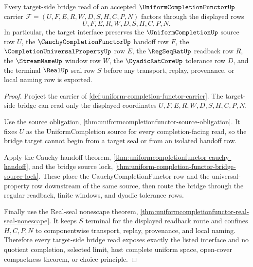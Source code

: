 \begin{theorem}
\label{thm:uniform-completion-functor-bridge-target-interface}
Every target-side bridge read of an accepted $\UniformCompletionFunctorUp$ carrier $\mathcal{F}=(U,F,E,R,W,D,S,H,C,P,N)$ factors through the displayed rows
$$
U,F,E,R,W,D,S,H,C,P,N .
$$
In particular, the target interface preserves the $\UniformCompletionUp$ source row $U$, the $\CauchyCompletionFunctorUp$ handoff row $F$, the $\CompletionUniversalPropertyUp$ row $E$, the $\RegSeqRatUp$ readback row $R$, the $\StreamNameUp$ window row $W$, the $\DyadicRatCoreUp$ tolerance row $D$, and the terminal $\RealUp$ seal row $S$ before any transport, replay, provenance, or local naming row is exported.
\end{theorem}
\begin{proof}
Project the carrier of \autoref{def:uniform-completion-functor-carrier}. The target-side bridge can read only the displayed coordinates $U,F,E,R,W,D,S,H,C,P,N$.

Use the source obligation, \autoref{thm:uniformcompletionfunctor-source-obligation}. It fixes $U$ as the UniformCompletion source for every completion-facing read, so the bridge target cannot begin from a target seal or from an isolated handoff row.

Apply the Cauchy handoff theorem, \autoref{thm:uniformcompletionfunctor-cauchy-handoff}, and the bridge source lock, \autoref{thm:uniform-completion-functor-bridge-source-lock}. These place the CauchyCompletionFunctor row and the universal-property row downstream of the same source, then route the bridge through the regular readback, finite windows, and dyadic tolerance rows.

Finally use the Real-seal nonescape theorem, \autoref{thm:uniformcompletionfunctor-real-seal-nonescape}. It keeps $S$ terminal for the displayed readback route and confines $H,C,P,N$ to componentwise transport, replay, provenance, and local naming. Therefore every target-side bridge read exposes exactly the listed interface and no quotient completion, selected limit, host complete uniform space, open-cover compactness theorem, or choice principle.
\end{proof}

